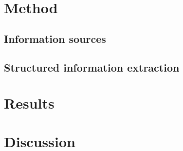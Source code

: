 \documentclass{article}
\begin{document}



\section{Method}

\subsection{Information sources}

\subsection{Structured information extraction}



\section{Results}



\section{Discussion}





\end{document}
